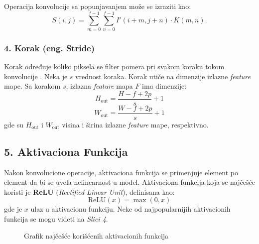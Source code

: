 \documentclass[12pt]{article}
\begin{document}
    Operacija konvolucije sa popunjavanjem može se izraziti kao:
    \[
    S(i, j) = \sum_{m=0}^{f-1} \sum_{n=0}^{f-1} I'(i+m, j+n) \cdot K(m, n).
    \]

   \subsubsection*{4. Korak (eng. Stride)}
   Korak određuje koliko piksela se filter pomera pri svakom koraku tokom konvolucije \cite{stride}. 
   Neka je \( s \) vrednost koraka. Korak utiče na dimenzije izlazne \textit{feature} mape. 
   Sa korakom \( s \), izlazna \textit{feature} mapa \( F \) ima dimenzije:
   \[
      H_{\text{out}} = \frac{H - f + 2p}{s} + 1
   \]
   \[
   W_{\text{out}} = \frac{W - f + 2p}{s} + 1
   \]
   gde su \( H_{\text{out}} \) i \( W_{\text{out}} \) visina i širina izlazne \textit{feature} mape, 
   respektivno.

   \subsection*{5. Aktivaciona Funkcija}

   Nakon konvolucione operacije, aktivaciona funkcija se primenjuje element po element da bi se 
   uvela nelinearnost u model. Aktivaciona funkcija koja se najčešće koristi je 
   \textbf{ReLU} (\textit{Rectified Linear Unit}), definisana kao:
   \[
   \text{ReLU}(x) = \max(0, x)
   \]
   gde je \( x \) ulaz u aktivacionu funkciju. Neke od najpopularnijih aktivacionih funkcija se mogu 
   videti na \textit{Slici 4}.

   \begin{figure}[h!]
      \centering
      \caption{Grafik najčešće korišćenih aktivacionih funkcija}
      \label{fig:pop_activations}
    \end{figure}
\end{document}
